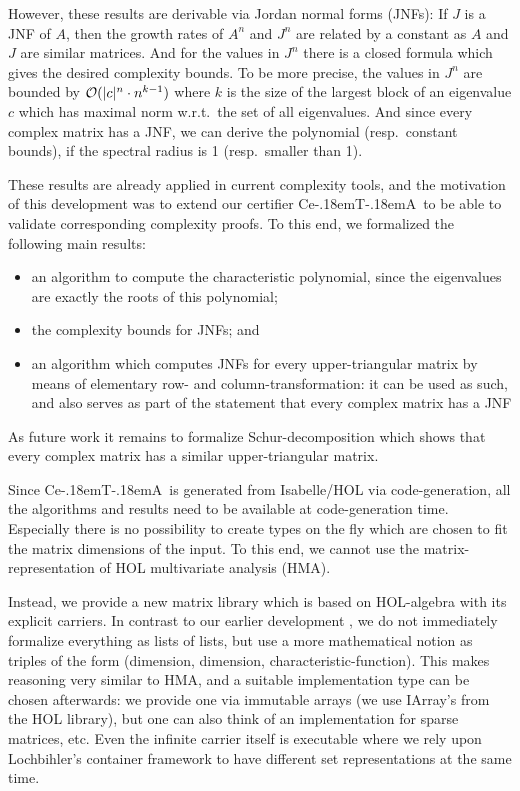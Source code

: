 \documentclass[11pt,a4paper]{article}
\newcommand\ceta{\textsf{Ce\kern-.18emT\kern-.18emA}}
\begin{document}
However, these results are derivable via Jordan normal forms (JNFs): 
If $J$ is a JNF of $A$, then the growth rates of $A^n$ and $J^n$ are related
by a constant as $A$ and $J$ are similar matrices. And for the values in $J^n$ 
there is a closed formula which gives the desired complexity bounds.
To be more precise, the values in $J^n$ are bounded by 
${\cal O}(|c|^n \cdot n^{k-1})$ where $k$ is the size of the largest
block of an eigenvalue $c$ which has maximal norm w.r.t.\ the set of all
eigenvalues. And since every complex matrix has a JNF, we can derive the 
polynomial (resp.\ constant bounds), if the spectral radius is 1 (resp.\ smaller
than 1).

These results are already applied in current complexity tools, and the motivation
of this development was to extend our certifier \ceta\ to be able to validate
corresponding complexity proofs. To this end, we formalized
the  following main results:
\begin{itemize}
\item an algorithm to compute the characteristic polynomial, since
  the eigenvalues are exactly the roots of this polynomial;
\item the complexity bounds for JNFs; and
\item an algorithm which computes JNFs for every upper-triangular matrix by 
  means of elementary row- and column-transformation:
  it can be used as such, and also serves as part of the statement that
  every complex matrix has a JNF
\end{itemize}

As future work it remains to formalize Schur-decomposition which shows
that every complex matrix has a similar upper-triangular matrix.

Since \ceta\ is generated from Isabelle/HOL via code-generation, all the 
algorithms and results need to be available at code-generation time. Especially
there is no possibility to create types on the fly which are chosen to fit 
the matrix dimensions of the input. To this end, we cannot use the 
matrix-representation of HOL multivariate analysis (HMA).

Instead, we provide a new matrix library which is based on HOL-algebra with
its explicit carriers. In contrast to our earlier development \cite{Matrix-AFP}, 
we do not immediately formalize everything as lists of lists, 
but use a more mathematical
notion as triples of the form (dimension, dimension, characteristic-function).
This makes reasoning very similar to HMA, and a suitable implementation type
can be chosen afterwards: we provide one via immutable arrays (we use IArray's from
the HOL library),
but one can also think of an implementation for sparse matrices, etc.
Even the infinite carrier itself is executable where we rely upon Lochbihler's
container framework \cite{Containers-AFP} to have different set representations 
at the same time.
\end{document}

